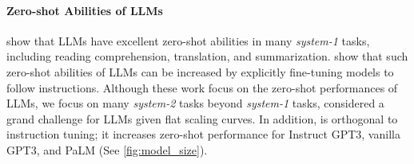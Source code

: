 \paragraph{Zero-shot Abilities of LLMs}  \citet{Radford2019LanguageMA} show that LLMs have excellent zero-shot abilities in many \textit{system-1} tasks, including reading comprehension, translation, and summarization. 
\citet{sanh2022multitask,instructgpt} show that such zero-shot abilities of LLMs can be increased by explicitly fine-tuning models to follow instructions. 
Although these work focus on the zero-shot performances of LLMs, we focus on many \textit{system-2} tasks beyond \textit{system-1} tasks, considered a grand challenge for LLMs given flat scaling curves. 
In addition, \ours is orthogonal to instruction tuning; it increases zero-shot performance for Instruct GPT3, vanilla GPT3, and PaLM (See \autoref{fig:model_size}). 



